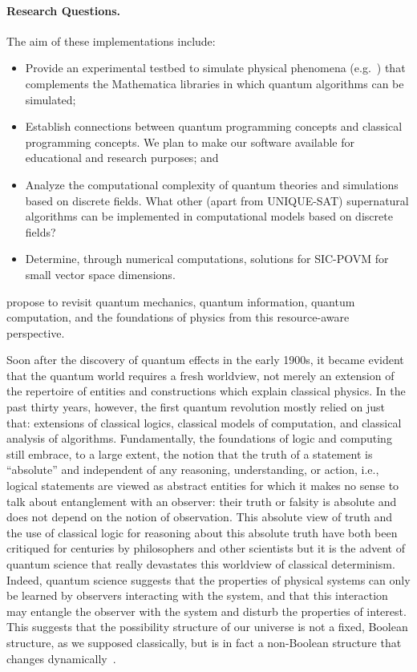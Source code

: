 \documentclass{article}
\theoremstyle{remark}
\begin{document}
\paragraph*{Research Questions.} The aim of these implementations
include:
\begin{itemize}
\item Provide an experimental testbed to simulate physical phenomena
  (e.g.~\cite {OrtizEtAl2001,SommEtAl2002}) that complements the
  Mathematica libraries in which quantum algorithms can be simulated;
\item Establish connections between quantum programming concepts and
  classical programming concepts. We plan to make our software
  available for educational and research purposes; and 
\item Analyze the computational complexity of quantum theories and
  simulations based on discrete fields. What other (apart from
  UNIQUE-SAT) supernatural algorithms can be implemented in
  computational models based on discrete fields?
\item Determine, through numerical computations, solutions for
  SIC-POVM for small vector space dimensions.
\end{itemize}






propose to revisit quantum mechanics, quantum information, quantum
computation, and the foundations of physics from this resource-aware
perspective. 


Soon after the discovery of quantum effects in the early 1900s, it
became evident that the quantum world requires a fresh worldview, not
merely an extension of the repertoire of entities and constructions
which explain classical physics. In the past thirty years, however,
the first quantum revolution mostly relied on just that: extensions of
classical logics, classical models of computation, and classical
analysis of algorithms. Fundamentally, the foundations of logic and
computing still embrace, to a large extent, the notion that the truth
of a statement is ``absolute'' and independent of any reasoning,
understanding, or action, i.e., logical statements are viewed as
abstract entities for which it makes no sense to talk about
entanglement with an observer: their truth or falsity is absolute and
does not depend on the notion of observation. This absolute view of
truth and the use of classical logic for reasoning about this absolute
truth have both been critiqued for centuries by philosophers and other
scientists but it is the advent of quantum science that really
devastates this worldview of classical determinism. Indeed, quantum
science suggests that the properties of physical systems can only be
learned by observers interacting with the system, and that this
interaction may entangle the observer with the system and disturb the
properties of interest. This suggests that the possibility structure
of our universe is not a fixed, Boolean structure, as we supposed
classically, but is in fact a non-Boolean structure that changes
dynamically~\cite{bub2006}.
\end{document}
